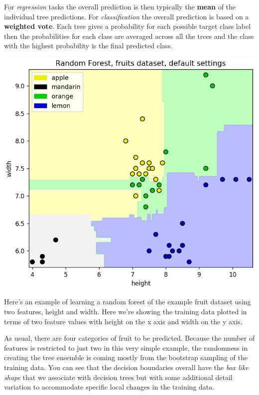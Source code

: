 \begin{multicols}{2}
For \emph{regression} tasks the overall prediction is then typically the \textbf{mean} of the individual tree predictions. For \emph{classification} the overall prediction is based on a \textbf{weighted vote}. Each tree gives a probability for each possible target class label then the probabilities for each class are averaged across all the trees and the class with the highest probability is the final predicted class. 

\begin{center}
	\includegraphics[width=\linewidth]{img/Random-Forest-Fruit-dataset.png} 
\end{center}

Here's an example of learning a random forest of the example fruit dataset using two features, height and width. Here we're showing the training data plotted in terms of two feature values with height on the x axis and width on the y axis. 

As usual, there are four categories of fruit to be predicted. Because the number of features is restricted to just two in this very simple example, the randomness in creating the tree ensemble is coming mostly from the bootstrap sampling of the training data. You can see that the decision boundaries overall have the \emph{box like shape} that we associate with decision trees but with some additional detail variation to accommodate specific local changes in the training data. 


\end{multicols}
